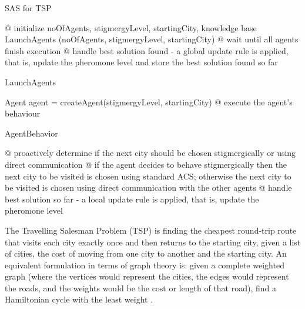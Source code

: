 \begin{algorithm}
\caption{SAS for TSP}
\label{alg:sastsp}
\begin{algorithmic}[1]

\STATE @ initialize noOfAgents, stigmergyLevel, startingCity, knowledge base
	\STATE LaunchAgents (noOfAgents, stigmergyLevel, startingCity)
	\STATE @ wait until all agents finish execution
	\STATE @ handle best solution found - a global update rule is applied, that is, update the pheromone level and store the best solution found so far
\ENDWHILE

\end{algorithmic}
\end{algorithm}

\begin{algorithm}
\caption{LaunchAgents}
\label{alg:launch}
\begin{algorithmic}[1]

\STATE Agent agent = createAgent(stigmergyLevel, startingCity)
\STATE @  execute the agent's behaviour
\ENDFOR
\end{algorithmic}
\end{algorithm}

\begin{algorithm}
\caption{AgentBehavior}
\label{alg:behaviour}
\begin{algorithmic}[1]

	\STATE @ proactively determine if the next city should be chosen stigmergically or using direct communication
	\STATE @ if the agent decides to behave stigmergically then the next city to be visited is chosen using standard 					ACS; otherwise the next city to be visited is chosen using direct communication with the other agents
	\STATE @ handle best solution so far - a local update rule is applied, that is, update the pheromone level
\ENDWHILE

\end{algorithmic}
\end{algorithm}

The Travelling Salesman Problem (TSP) is finding the cheapest round-trip route that visits each city exactly
once and then returns to the starting city, given a list of cities, the cost of moving from one city to another and the starting city. An equivalent formulation in terms of graph theory is: given a complete weighted graph (where the vertices would represent the cities, the edges would represent the roads, and the weights would be the cost or
length of that road), find a Hamiltonian cycle with the least weight \cite{tspgraph99}.

